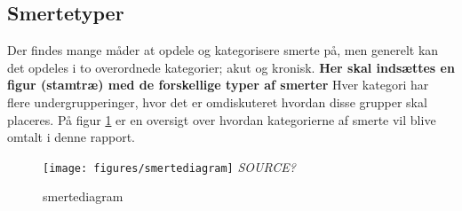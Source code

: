 
\subsection{Smertetyper}


Der findes mange måder at opdele og kategorisere smerte på, men generelt kan det opdeles i to overordnede kategorier; akut og kronisk.
\textbf{Her skal indsættes en figur (stamtræ) med de forskellige typer af smerter} 
Hver kategori har flere undergrupperinger, hvor det er omdiskuteret hvordan disse grupper skal placeres. \citep{Giangragorio1997} På figur \ref{smertediagram} er en oversigt over hvordan kategorierne af smerte vil blive omtalt i denne rapport.

\begin{figure}[H]
	\caption{smertediagram}
	\label{smertediagram}
	\centering
	\texttt{[image: figures/smertediagram]}
	\flushleft
	\textit{SOURCE?}
\end{figure}

